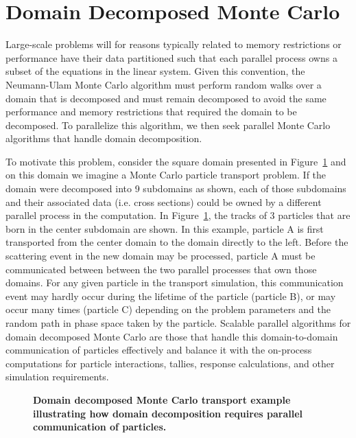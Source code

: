 \section{Domain Decomposed Monte Carlo\ }
\label{sec:msod}
Large-scale problems will for reasons typically related to memory
restrictions or performance have their data partitioned such that each
parallel process owns a subset of the equations in the linear
system. Given this convention, the Neumann-Ulam Monte Carlo algorithm
must perform random walks over a domain that is decomposed and must
remain decomposed to avoid the same performance and memory
restrictions that required the domain to be decomposed. To parallelize
this algorithm, we then seek parallel Monte Carlo algorithms that
handle domain decomposition.

To motivate this problem, consider the square domain presented in
Figure~\ref{fig:ddmc_example} and on this domain we imagine a Monte
Carlo particle transport problem. If the domain were decomposed into 9
subdomains as shown, each of those subdomains and their associated
data (i.e. cross sections) could be owned by a different parallel
process in the computation. In Figure~\ref{fig:ddmc_example}, the
tracks of 3 particles that are born in the center subdomain are
shown. In this example, particle A is first transported from the
center domain to the domain directly to the left. Before the
scattering event in the new domain may be processed, particle A must
be communicated between between the two parallel processes that own
those domains. For any given particle in the transport simulation,
this communication event may hardly occur during the lifetime of the
particle (particle B), or may occur many times (particle C) depending
on the problem parameters and the random path in phase space taken by
the particle. Scalable parallel algorithms for domain decomposed Monte
Carlo are those that handle this domain-to-domain communication of
particles effectively and balance it with the on-process computations
for particle interactions, tallies, response calculations, and other
simulation requirements.
\begin{figure}[t!]
  \begin{center}
    \scalebox{1.5}{
       }
  \end{center}
  \caption{\textbf{Domain decomposed Monte Carlo transport example
      illustrating how domain decomposition requires parallel
      communication of particles.}}
  \label{fig:ddmc_example}
\end{figure}


